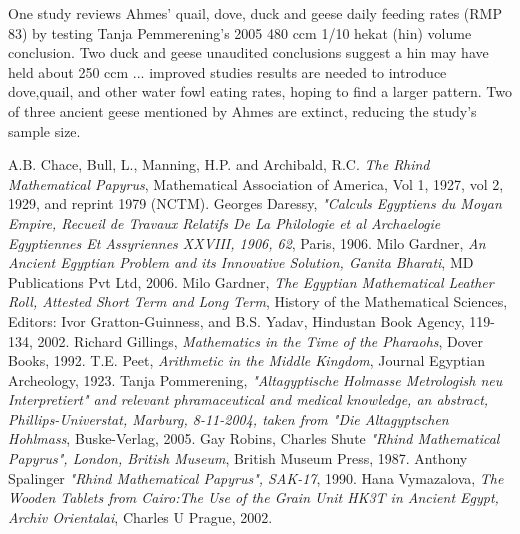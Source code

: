 \documentclass[12pt]{article}
\begin{document}
One study reviews Ahmes' quail, dove, duck and geese daily feeding rates (RMP 83) by testing Tanja Pemmerening's 2005 480 ccm 1/10 hekat (hin) volume conclusion. Two duck and geese unaudited conclusions suggest a hin may have held about 250 ccm ... improved studies results are needed to introduce dove,quail, and other water fowl eating rates, hoping to find a larger pattern. Two of three ancient geese mentioned by Ahmes are extinct, reducing the study's sample size.

\begin{thebibliography}{10}

A.B. Chace, Bull, L., Manning, H.P. and Archibald, R.C. \emph{The Rhind Mathematical Papyrus}, Mathematical Association of America, Vol 1, 1927, vol 2, 1929, and reprint 1979 (NCTM).
 Georges Daressy, \emph{"Calculs Egyptiens du Moyan Empire‚ Recueil de Travaux Relatifs  De La  Philologie et al Archaelogie Egyptiennes Et Assyriennes XXVIII, 1906, 62}, Paris, 1906.
 Milo Gardner, \emph{An Ancient Egyptian Problem and its Innovative Solution, Ganita Bharati}, MD Publications Pvt Ltd, 2006.
 Milo Gardner, \emph{The Egyptian Mathematical Leather Roll, Attested Short Term and Long Term}, History of the Mathematical Sciences, Editors: Ivor Gratton-Guinness, and B.S. Yadav, Hindustan Book Agency, 119-134, 2002.
Richard Gillings, \emph{Mathematics in the Time of the Pharaohs}, Dover Books, 1992.
 T.E. Peet, \emph{Arithmetic in the Middle Kingdom}, Journal Egyptian Archeology, 1923.
 Tanja Pommerening, \emph{"Altagyptische Holmasse Metrologish neu Interpretiert" and relevant phramaceutical and medical knowledge, an abstract,  Phillips-Universtat, Marburg, 8-11-2004, taken from "Die Altagyptschen Hohlmass}, Buske-Verlag, 2005.
 Gay Robins, Charles Shute \emph{"Rhind Mathematical Papyrus", London, British Museum}, British Museum Press, 1987.
 Anthony Spalinger \emph{"Rhind Mathematical Papyrus", SAK-17}, 1990.
 Hana Vymazalova, \emph{The Wooden Tablets from Cairo:The Use of the Grain Unit HK3T in Ancient Egypt, Archiv Orientalai}, Charles U Prague, 2002.
\end{thebibliography}


\end{document}
